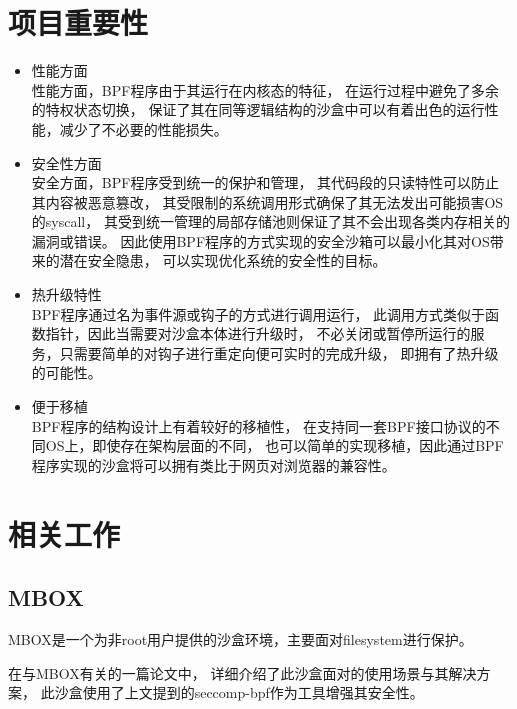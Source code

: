 \documentclass[AutoFakeBold,a4paper]{ctexart}
\begin{document}
\section{项目重要性}

\begin{itemize}
    \item 性能方面\\
    性能方面，BPF程序由于其运行在内核态的特征，
    在运行过程中避免了多余的特权状态切换，
    保证了其在同等逻辑结构的沙盒中可以有着出色的运行性能，减少了不必要的性能损失。

    \item 安全性方面\\
    安全方面，BPF程序受到统一的保护和管理，
    其代码段的只读特性可以防止其内容被恶意篡改，
    其受限制的系统调用形式确保了其无法发出可能损害OS的syscall，
    其受到统一管理的局部存储池则保证了其不会出现各类内存相关的漏洞或错误。
    因此使用BPF程序的方式实现的安全沙箱可以最小化其对OS带来的潜在安全隐患，
    可以实现优化系统的安全性的目标。

    \item 热升级特性\\
    BPF程序通过名为事件源或钩子的方式进行调用运行，
    此调用方式类似于函数指针，因此当需要对沙盒本体进行升级时，
    不必关闭或暂停所运行的服务，只需要简单的对钩子进行重定向便可实时的完成升级，
    即拥有了热升级的可能性。

    \item 便于移植\\
    BPF程序的结构设计上有着较好的移植性，
    在支持同一套BPF接口协议的不同OS上，即使存在架构层面的不同，
    也可以简单的实现移植，因此通过BPF程序实现的沙盒将可以拥有类比于网页对浏览器的兼容性。

\end{itemize}

\section{相关工作}

\subsection{MBOX}
MBOX是一个为非root用户提供的沙盒环境，主要面对filesystem进行保护。

在与MBOX有关的一篇论文\cite{180196}中，
详细介绍了此沙盒面对的使用场景与其解决方案，
此沙盒使用了上文提到的seccomp-bpf作为工具增强其安全性。
\end{document}
